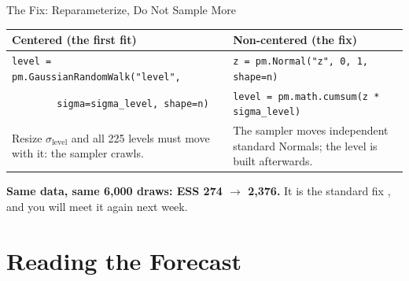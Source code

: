 \documentclass[aspectratio=169, 11pt]{beamer}
\begin{document}
\begin{frame}{The Fix: Reparameterize, Do Not Sample More}
  \begin{center}
    {\small
    \begin{tabular}{p{6.3cm}p{6.3cm}}
      \toprule
      \textbf{Centered} (the first fit) & \textbf{Non-centered} (the fix) \\
      \midrule
      {\scriptsize\texttt{level = pm.GaussianRandomWalk("level",}} &
      {\scriptsize\texttt{z = pm.Normal("z", 0, 1, shape=n)}} \\
      {\scriptsize\texttt{\mbox{}\ \ \ \ \ \ \ \ sigma=sigma\_level, shape=n)}} &
      {\scriptsize\texttt{level = pm.math.cumsum(z * sigma\_level)}} \\[4pt]
      Resize $\sigma_{\text{level}}$ and all 225 levels must move with it: the sampler crawls. &
      The sampler moves independent standard Normals; the level is built afterwards. \\
      \bottomrule
    \end{tabular}
    }
  \end{center}

  \begin{warningbox}
    \textbf{Same data, same 6{,}000 draws: ESS 274 $\to$ 2{,}376.} It is the standard fix
    \parencite[§4.6.1]{MartinKumarLao2021}, and you will meet it again next week.
  \end{warningbox}

\end{frame}

\section{Reading the Forecast}

\end{document}

